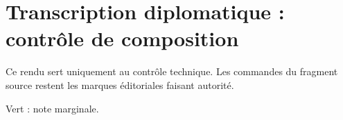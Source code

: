 \documentclass[a4paper,11pt]{article}
\providecommand{\TranscriptionInput}{MPL_64_078-115_transcription.tex}
\begin{document}
\thispagestyle{empty}
\section*{Transcription diplomatique : contrôle de composition}
\noindent Ce rendu sert uniquement au contrôle technique. Les commandes du
fragment source restent les marques éditoriales faisant autorité.

\noindent{}\quad
{}\quad
{}\quad
{\color{qaMargin}Vert : note marginale.}


\end{document}
